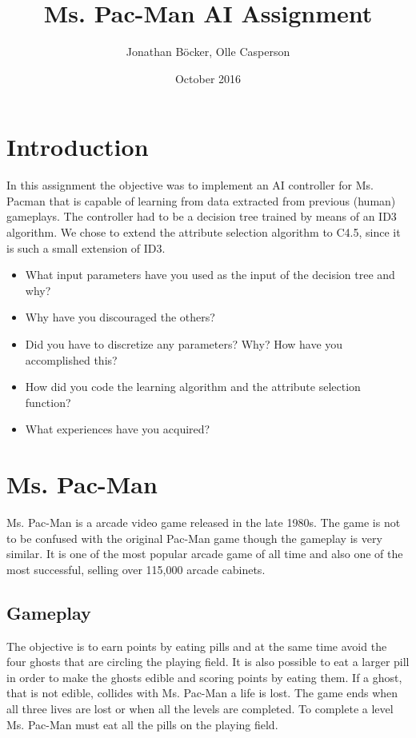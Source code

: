\documentclass{article}
\title{Ms. Pac-Man AI Assignment}
\author{Jonathan Böcker, Olle Casperson }
\date{October 2016}
\begin{document}
\maketitle
\section{Introduction}
In this assignment the objective was to implement an AI controller for Ms. Pacman that is capable of learning from data extracted from previous (human) gameplays. The controller had to be a decision tree
trained by means of an ID3 algorithm\citep{russel2010artifical}. We chose to extend the attribute selection algorithm to C4.5\citep{russel2010artifical}, since it is such a small extension of ID3.

\iffalse  %
\begin{itemize}
    \item What input parameters have you used as the input of the decision tree and why?
    \item Why have you discouraged the others?
    \item Did you have to discretize any parameters? Why? How have you accomplished this?
    \item How did you code the learning algorithm and the attribute selection function?
    \item What experiences have you acquired?
\end{itemize}

\section{Ms. Pac-Man}
Ms. Pac-Man is a arcade video game released in the late 1980s. The game is not to be confused with the original Pac-Man game though the gameplay is very similar. It is one of the most popular arcade game of all time and also one of the most successful, selling over 115,000 arcade cabinets.  \citep{mspacmanwiki}

    \subsection{Gameplay}
    The objective is to earn points by eating pills and at the same time avoid the four ghosts that are circling the playing field. It is also possible to eat a larger pill in order to make the ghosts edible and scoring points by eating them. If a ghost, that is not edible, collides with Ms. Pac-Man a life is lost. The game ends when all three lives are lost or when all the levels are completed. To complete a level Ms. Pac-Man must eat all the pills on the playing field.
\end{document}
